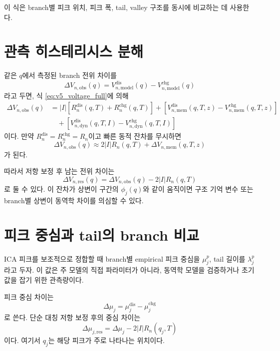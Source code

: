 \documentclass[11pt,a4paper]{article}
\newcommand{\dis}{\mathrm{dis}}
\newcommand{\chg}{\mathrm{chg}}
\begin{document}
이 식은 branch별 피크 위치, 피크 폭, tail, valley 구조를 동시에 비교하는 데 사용한다.

\section{관측 히스테리시스 분해}
같은 \(q\)에서 측정된 branch 전위 차이를
\begin{equation}
\Delta V_{n,\mathrm{obs}}(q)
=
V_{n,\mathrm{model}}^{\dis}(q)-V_{n,\mathrm{model}}^{\chg}(q)
\end{equation}
라고 두면, 식 \eqref{eq:v5_voltage_full}에 의해
\begin{align}
\Delta V_{n,\mathrm{obs}}(q)
&=
|I|\left[R_n^{\dis}(q,T)+R_n^{\chg}(q,T)\right]
+
\left[V_{n,\mathrm{mem}}^{\dis}(q,T,z)-V_{n,\mathrm{mem}}^{\chg}(q,T,z)\right]\\
&\quad+
\left[V_{n,\mathrm{dyn}}^{\dis}(q,T,I)-V_{n,\mathrm{dyn}}^{\chg}(q,T,I)\right]
\end{align}
이다. 만약 \(R_n^{\dis}=R_n^{\chg}=R_n\)이고 빠른 동적 잔차를 무시하면
\begin{equation}
\Delta V_{n,\mathrm{obs}}(q)
\approx
2|I|R_n(q,T)
+
\Delta V_{n,\mathrm{mem}}(q,T,z)
\end{equation}
가 된다.

따라서 저항 보정 후 남는 전위 차이는
\begin{equation}
\Delta V_{n,\mathrm{res}}(q)
=
\Delta V_{n,\mathrm{obs}}(q)-2|I|R_n(q,T)
\end{equation}
로 둘 수 있다. 이 잔차가 상변이 구간의 \(\phi_j(q)\)와 같이 움직이면 구조 기억 변수 또는 branch별 상변이 동역학 차이를 의심할 수 있다.

\section{피크 중심과 tail의 branch 비교}
ICA 피크를 보조적으로 정합할 때 branch별 empirical 피크 중심을 \(\mu_j^{p}\), tail 길이를 \(\lambda_j^{p}\)라고 두자. 이 값은 주 모델의 직접 파라미터가 아니라, 동역학 모델을 검증하거나 초기값을 잡기 위한 관측량이다.

피크 중심 차이는
\begin{equation}
\Delta\mu_j=\mu_j^{\dis}-\mu_j^{\chg}
\end{equation}
로 쓴다. 단순 대칭 저항 보정 후의 중심 차이는
\begin{equation}
\Delta\mu_{j,\mathrm{res}}
=
\Delta\mu_j-2|I|R_n(q_j,T)
\end{equation}
이다. 여기서 \(q_j\)는 해당 피크가 주로 나타나는 위치이다.
\end{document}
